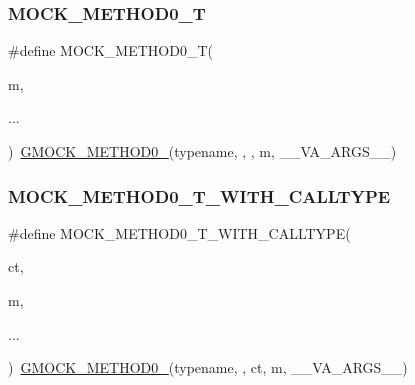 \mbox{\label{googletest-master_2googlemock_2include_2gmock_2gmock-generated-function-mockers_8h_a55a5a1a22cec416ead5605a2da39eec8}} 
\subsubsection{\texorpdfstring{MOCK\_METHOD0\_T}{MOCK\_METHOD0\_T}}
{\footnotesize\ttfamily \#define M\+O\+C\+K\+\_\+\+M\+E\+T\+H\+O\+D0\+\_\+T(\begin{DoxyParamCaption}\item[{}]{m,  }\item[{}]{... }\end{DoxyParamCaption})~\mbox{\hyperlink{_obj__test_2lib_2googletest-release-1_88_81_2googlemock_2include_2gmock_2gmock-generated-function-mockers_8h_ae0d290ffa58d7c624b2e3487ba1252f4}{G\+M\+O\+C\+K\+\_\+\+M\+E\+T\+H\+O\+D0\+\_\+}}(typename, , , m, \+\_\+\+\_\+\+V\+A\+\_\+\+A\+R\+G\+S\+\_\+\+\_\+)}

\mbox{\label{googletest-master_2googlemock_2include_2gmock_2gmock-generated-function-mockers_8h_a68a3dcece1b6932b4dbda2216ff4fa90}} 
\subsubsection{\texorpdfstring{MOCK\_METHOD0\_T\_WITH\_CALLTYPE}{MOCK\_METHOD0\_T\_WITH\_CALLTYPE}}
{\footnotesize\ttfamily \#define M\+O\+C\+K\+\_\+\+M\+E\+T\+H\+O\+D0\+\_\+\+T\+\_\+\+W\+I\+T\+H\+\_\+\+C\+A\+L\+L\+T\+Y\+PE(\begin{DoxyParamCaption}\item[{}]{ct,  }\item[{}]{m,  }\item[{}]{... }\end{DoxyParamCaption})~\mbox{\hyperlink{_obj__test_2lib_2googletest-release-1_88_81_2googlemock_2include_2gmock_2gmock-generated-function-mockers_8h_ae0d290ffa58d7c624b2e3487ba1252f4}{G\+M\+O\+C\+K\+\_\+\+M\+E\+T\+H\+O\+D0\+\_\+}}(typename, , ct, m, \+\_\+\+\_\+\+V\+A\+\_\+\+A\+R\+G\+S\+\_\+\+\_\+)}

